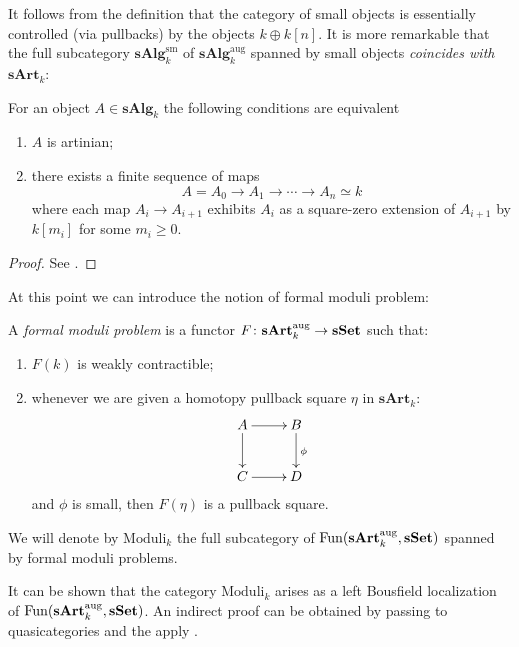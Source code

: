 \begin{refsection}
It follows from the definition that the category of small objects is essentially controlled (via pullbacks) by the objects $k \oplus k[n]$. It is more remarkable that the full subcategory $\mathbf{sAlg}_k^{\mathrm{sm}}$ of $\mathbf{sAlg}_k^{\mathrm{aug}}$ spanned by small objects \emph{coincides with $\mathbf{sArt}_k$}:

\begin{prop} \label{prop characterizing artinians}
For an object $A \in \mathbf{sAlg}_k$ the following conditions are equivalent
\begin{enumerate}
\item $A$ is artinian;
\item there exists a finite sequence of maps
\[
A = A_0 \to A_1 \to \cdots \to A_n \simeq k
\]
where each map $A_i \to A_{i+1}$ exhibits $A_i$ as a square-zero extension of $A_{i+1}$ by $k[m_i]$ for some $m_i \ge 0$.
\end{enumerate}
\end{prop}

\begin{proof}
See \cite[Proposition 1.1.11]{dagx}.
\end{proof}

At this point we can introduce the notion of formal moduli problem:

\begin{defin}
A \emph{formal moduli problem} is a functor $F \colon \mathbf{sArt}_k^{\mathrm{aug}} \to \mathbf{sSet}$ such that:
\begin{enumerate}
\item $F(k)$ is weakly contractible;
\item whenever we are given a homotopy pullback square $\eta$ in $\mathbf{sArt}_k$:
\[
\xymatrix{
A \ar[r] \ar[d] & B \ar[d]^\phi \\ C \ar[r] & D
}
\]
and $\phi$ is small, then $F(\eta)$ is a pullback square.
\end{enumerate}
We will denote by $\mathrm{Moduli}_k$ the full subcategory of $\mathrm{Fun}(\mathbf{sArt}_k^{\mathrm{aug}}, \mathbf{sSet})$ spanned by formal moduli problems.
\end{defin}

\begin{rmk}
It can be shown that the category $\mathrm{Moduli}_k$ arises as a left Bousfield localization of $\mathrm{Fun}(\mathbf{sArt}_k^{\mathrm{aug}}, \mathbf{sSet})$. An indirect proof can be obtained by passing to quasicategories and the apply \cite[Propositions 5.5.4.18 and 5.5.4.19]{htt}.
\end{rmk}


\end{refsection}
